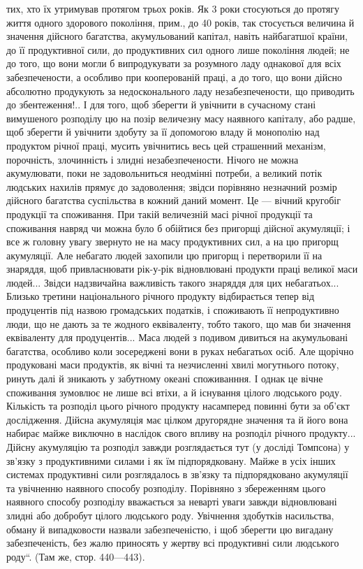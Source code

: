 \parcont{}  %
тих, хто їх утримував протягом трьох років. Як 3 роки стосуються
до протягу життя одного здорового покоління, прим., до 40 років,
так стосується величина й значення дійсного багатства, акумульований
капітал, навіть найбагатшої країни, до її продуктивної сили, до продуктивних
сил одного лише покоління людей; не до того, що вони могли б
випродукувати за розумного ладу однакової для всіх забезпечености, а
особливо при кооперованій праці, а до того, що вони дійсно абсолютно
продукують за недосконального ладу незабезпечености, що приводить до
збентеження!.. І для того, щоб зберегти й увічнити в сучасному стані вимушеного
розподілу цю на позір величезну масу наявного капіталу, або радше,
щоб зберегти й увічнити здобуту за її допомогою владу й монополію
над продуктом річної праці, мусить увічнитись весь цей страшенний
механізм, порочність, злочинність і злидні незабезпечености. Нічого не
можна акумулювати, поки не задовольниться неодмінні потреби, а великий
потік людських нахилів прямує до задоволення; звідси порівняно незначний
розмір дійсного багатства суспільства в кожний даний момент.
Це — вічний кругобіг продукції та споживання. При такій величезній масі
річної продукції та споживання навряд чи можна було б обійтися без
пригорщі дійсної акумуляції; і все ж головну увагу звернуто не на
масу продуктивних сил, а на цю пригорщ акумуляції. Але небагато
людей захопили цю пригорщ і перетворили її на знаряддя, щоб
привласнювати рік-у-рік відновлювані продукти праці великої маси людей...
Звідси надзвичайна важливість такого знаряддя для цих небагатьох...
Близько третини національного річного продукту відбирається тепер від
продуцентів під назвою громадських податків, і споживають її непродуктивно
люди, що не дають за те жодного еквіваленту, тобто такого, що
мав би значення еквіваленту для продуцентів... Маса людей з подивом
дивиться на акумульовані багатства, особливо коли зосереджені вони в
руках небагатьох осіб. Але щорічно продуковані маси продуктів, як
вічні та незчисленні хвилі могутнього потоку, ринуть далі й зникають у
забутному океані споживанння. І однак це вічне споживання зумовлює
не лише всі втіхи, а й існування цілого людського роду. Кількість та
розподіл цього річного продукту насамперед повинні бути за об’єкт дослідження.
Дійсна акумуляція має цілком другорядне значення та й його
вона набирає майже виключно в наслідок свого впливу на розподіл річного
продукту... Дійсну акумуляцію та розподіл завжди розглядається тут
(у досліді Томпсона) у зв'язку з продуктивними силами і як їм підпорядковану.
Майже в усіх інших системах продуктивні сили розглядалось
в зв’язку та підпорядковано акумуляції та увічненню наявного
способу розподілу. Порівняно з збереженням цього наявного способу
розподілу вважається за неварті уваги завжди відновлювані злидні або
добробут цілого людського роду. Увічнення здобутків насильства, обману
й випадковости назвали забезпеченістю, і щоб зберегти цю вигадану
забезпеченість, без жалю приносять у жертву всі продуктивні сили
людського роду“. (Там же, стор. 440—443).
